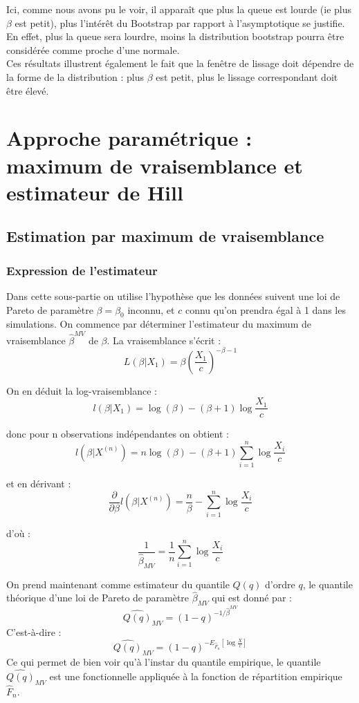 \documentclass{article}
\renewcommand*{\(}{ \left( }
\renewcommand*{\)}{ \right) }
\begin{document}
Ici, comme nous avons pu le voir, il apparaît que plus la queue est lourde (ie plus $\beta$ est petit), plus l'intérêt du Bootstrap par rapport à l'asymptotique se justifie. En effet, plus la queue sera lourdre, moins la distribution bootstrap pourra être considérée comme proche d'une normale. \\

Ces résultats illustrent également le fait que la fenêtre de lissage doit dépendre de la forme de la distribution : plus $\beta$ est petit, plus le lissage correspondant doit être élevé.


\clearpage
\section{Approche paramétrique : maximum de vraisemblance et estimateur de Hill}

\subsection{Estimation par maximum de vraisemblance}

\subsubsection{Expression de l'estimateur}

Dans cette sous-partie on utilise l'hypothèse que les données suivent une loi de Pareto de paramètre $\beta = \beta_0$ inconnu, et $c$ connu qu'on prendra égal à 1 dans les simulations. On commence par déterminer l'estimateur du maximum de vraisemblance  $\widehat{\beta}^{MV}$ de $\beta$. La vraisemblance s'écrit :
\[ L(\beta|X_1) = \beta \left( \frac{X_1}{c} \right)^{-\beta - 1} \]

\noindent On en déduit la log-vraisemblance :
\[ l(\beta|X_1) = \log(\beta) - (\beta + 1) \log \frac{X_1}{c} \]

\noindent donc pour n observations indépendantes on obtient :
\[ l\(\beta|X^{(n)}\) = n \log(\beta) - (\beta + 1) \sum_{i=1}^{n}\log \frac{X_i}{c} \]

\noindent et en dérivant :
\[ \frac{\partial}{\partial \beta} l\(\beta|X^{(n)}\) = \frac{n}{\beta} - \sum_{i=1}^{n}\log \frac{X_i}{c} \]

\noindent d'où :
\[\frac{1}{\widehat{\beta}_{MV}} = \frac{1}{n} \sum_{i=1}^{n}\log \frac{X_i}{c} \]

On prend maintenant comme estimateur du quantile $Q(q)$ d'ordre $q$, le quantile théorique d'une loi de Pareto de paramètre $\widehat{\beta}_{MV}$ qui est donné par :
\[ \widehat{Q(q)}_{MV} = (1-q)^{-1/\widehat{\beta}^{MV}} \]
C'est-à-dire :
\[ \widehat{Q(q)}_{MV} = (1-q)^{- E_{\hat{F}_n} \left[ \log \frac{X}{c} \right] } \]
Ce qui permet de bien voir qu'à l'instar du quantile empirique, le quantile $\widehat{Q(q)}_{MV}$ est une fonctionnelle appliquée à la fonction de répartition empirique $\hat{F}_n$.
\end{document}
